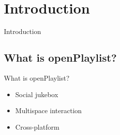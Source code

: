 \section{Introduction}
\begin{frame}{Introduction}
\end{frame}

\subsection{What is openPlaylist?}
\begin{frame}{What is openPlaylist?}
	\begin{itemize}
		\item Social jukebox
		\item Multispace interaction
		\item Cross-platform
	\end{itemize}
\end{frame}